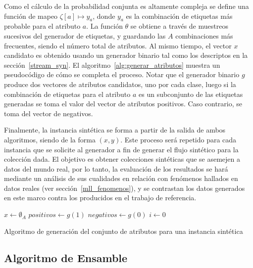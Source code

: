 Como el cálculo de la probabilidad conjunta es altamente compleja se define una
función de mapeo $\zeta[a] \mapsto y_{a}$, donde $y_{a}$ es la combinación de
etiquetas más probable para el atributo $a$.  La función $\theta$ se obtiene a
través de muestreos sucesivos del generador de etiquetas, y guardando las $A$
combinaciones más frecuentes, siendo el número total de atributos. Al mismo
tiempo, el vector $x$ candidato es obtenido usando un generador binario tal como
los descriptos en la sección~\ref{stream_syn}. El
algoritmo~\ref{alg:generar_atributos} muestra un pseudocódigo de cómo se
completa el proceso. Notar que el generador binario $g$ produce dos vectores de
atributos candidatos, uno por cada clase, luego si la combinación de etiquetas
para el atributo $a$ es un subconjunto de las etiquetas generadas se toma el
valor del vector de atributos positivos. Caso contrario, se toma del vector de
negativos.

Finalmente, la instancia sintética se forma a partir de la salida de ambos
algoritmos, siendo de la forma $(x, y)$. Este proceso será repetido para cada
instancia que se solicite al generador a fin de generar el flujo sintético para
la colección dada. El objetivo es obtener colecciones sintéticas que se asemejen
a datos del mundo real, por lo tanto, la evaluación de los resultados se hará
mediante un análisis de sus cualidades en relación con fenómenos hallados en
datos reales (ver sección~\ref{mll_fenomenos}), y se contrastan los datos
generados en este marco contra los producidos en el trabajo de referencia.

\begin{center}
	\begin{algorithm}[H]
		\label{alg:generar_atributos}
		\SetAlgoLined
		\DontPrintSemicolon
		$x \gets \emptyset_{A}$\;
		$positivos \gets g(1)$ \;
		$negativos \gets g(0)$ \;
		$i \gets 0$ \;
		\caption{Algoritmo de generación del conjunto de atributos para una
			instancia sintética}
	\end{algorithm}
\end{center}

\subsection{Algoritmo de Ensamble}
\label{tecnica_algoritmo_ensamble}

